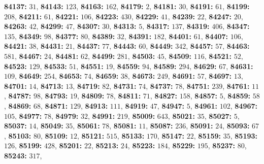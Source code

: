 \textsf{\bfseries 84137:} $31$, \textsf{\bfseries 84143:} $123$, \textsf{\bfseries 84163:} $162$, \textsf{\bfseries 84179:} $2$, \textsf{\bfseries 84181:} $30$, \textsf{\bfseries 84191:} $61$, \textsf{\bfseries 84199:} $208$, \textsf{\bfseries 84211:} $61$, \textsf{\bfseries 84221:} $106$, \textsf{\bfseries 84223:} $430$, \textsf{\bfseries 84229:} $41$, \textsf{\bfseries 84239:} $22$, \textsf{\bfseries 84247:} $20$, \textsf{\bfseries 84263:} $42$, \textsf{\bfseries 84299:} $47$, \textsf{\bfseries 84307:} $30$, \textsf{\bfseries 84313:} $5$, \textsf{\bfseries 84317:} $137$, \textsf{\bfseries 84319:} $406$, \textsf{\bfseries 84347:} $135$, \textsf{\bfseries 84349:} $98$, \textsf{\bfseries 84377:} $80$, \textsf{\bfseries 84389:} $32$, \textsf{\bfseries 84391:} $182$, \textsf{\bfseries 84401:} $61$, \textsf{\bfseries 84407:} $106$, \textsf{\bfseries 84421:} $38$, \textsf{\bfseries 84431:} $21$, \textsf{\bfseries 84437:} $77$, \textsf{\bfseries 84443:} $60$, \textsf{\bfseries 84449:} $342$, \textsf{\bfseries 84457:} $57$, \textsf{\bfseries 84463:} $581$, \textsf{\bfseries 84467:} $24$, \textsf{\bfseries 84481:} $62$, \textsf{\bfseries 84499:} $281$, \textsf{\bfseries 84503:} $45$, \textsf{\bfseries 84509:} $116$, \textsf{\bfseries 84521:} $52$, \textsf{\bfseries 84523:} $129$, \textsf{\bfseries 84533:} $51$, \textsf{\bfseries 84551:} $19$, \textsf{\bfseries 84559:} $94$, \textsf{\bfseries 84589:} $294$, \textsf{\bfseries 84629:} $67$, \textsf{\bfseries 84631:} $109$, \textsf{\bfseries 84649:} $254$, \textsf{\bfseries 84653:} $74$, \textsf{\bfseries 84659:} $38$, \textsf{\bfseries 84673:} $249$, \textsf{\bfseries 84691:} $57$, \textsf{\bfseries 84697:} $13$, \textsf{\bfseries 84701:} $14$, \textsf{\bfseries 84713:} $13$, \textsf{\bfseries 84719:} $82$, \textsf{\bfseries 84731:} $74$, \textsf{\bfseries 84737:} $78$, \textsf{\bfseries 84751:} $239$, \textsf{\bfseries 84761:} $11$, \textsf{\bfseries 84787:} $98$, \textsf{\bfseries 84793:} $19$, \textsf{\bfseries 84809:} $78$, \textsf{\bfseries 84811:} $71$, \textsf{\bfseries 84827:} $158$, \textsf{\bfseries 84857:} $5$, \textsf{\bfseries 84859:} $58$, \textsf{\bfseries 84869:} $68$, \textsf{\bfseries 84871:} $129$, \textsf{\bfseries 84913:} $111$, \textsf{\bfseries 84919:} $47$, \textsf{\bfseries 84947:} $5$, \textsf{\bfseries 84961:} $102$, \textsf{\bfseries 84967:} $105$, \textsf{\bfseries 84977:} $78$, \textsf{\bfseries 84979:} $32$, \textsf{\bfseries 84991:} $219$, \textsf{\bfseries 85009:} $643$, \textsf{\bfseries 85021:} $35$, \textsf{\bfseries 85027:} $5$, \textsf{\bfseries 85037:} $14$, \textsf{\bfseries 85049:} $35$, \textsf{\bfseries 85061:} $78$, \textsf{\bfseries 85081:} $11$, \textsf{\bfseries 85087:} $236$, \textsf{\bfseries 85091:} $24$, \textsf{\bfseries 85093:} $67$, \textsf{\bfseries 85103:} $80$, \textsf{\bfseries 85109:} $12$, \textsf{\bfseries 85121:} $515$, \textsf{\bfseries 85133:} $170$, \textsf{\bfseries 85147:} $22$, \textsf{\bfseries 85159:} $35$, \textsf{\bfseries 85193:} $126$, \textsf{\bfseries 85199:} $428$, \textsf{\bfseries 85201:} $22$, \textsf{\bfseries 85213:} $24$, \textsf{\bfseries 85223:} $184$, \textsf{\bfseries 85229:} $195$, \textsf{\bfseries 85237:} $80$, \textsf{\bfseries 85243:} $317$, 

